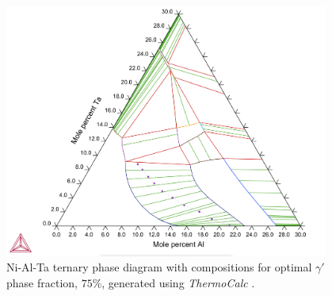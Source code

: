\begin{figure}[h]
  \centering
  \includegraphics[width=0.95\textwidth]{graficas/Q2_NiAlTa_ternary03.png}
  \caption{Ni-Al-Ta ternary phase diagram with compositions for optimal $\gamma'$ phase fraction, $75\%$, generated using \textit{ThermoCalc} \citep{thermocalc}.}
  \label{fig:diagram03}
\end{figure}